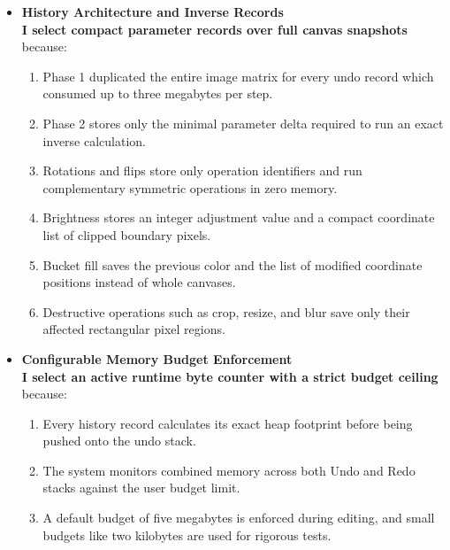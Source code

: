 \documentclass[10pt,a4paper]{article}
\begin{document}
\begin{itemize}[leftmargin=1.2em,noitemsep,topsep=2pt,parsep=1pt]
    \item \textbf{History Architecture and Inverse Records}\\[3pt]
    \textbf{I select compact parameter records over full canvas snapshots} because:
    \begin{enumerate}[label=\arabic*),leftmargin=1.5em,noitemsep,topsep=1pt,parsep=1pt]
        \item Phase 1 duplicated the entire image matrix for every undo record which consumed up to three megabytes per step.
        \item Phase 2 stores only the minimal parameter delta required to run an exact inverse calculation.
        \item Rotations and flips store only operation identifiers and run complementary symmetric operations in zero memory.
        \item Brightness stores an integer adjustment value and a compact coordinate list of clipped boundary pixels.
        \item Bucket fill saves the previous color and the list of modified coordinate positions instead of whole canvases.
        \item Destructive operations such as crop, resize, and blur save only their affected rectangular pixel regions.
    \end{enumerate}

    \item \textbf{Configurable Memory Budget Enforcement}\\[3pt]
    \textbf{I select an active runtime byte counter with a strict budget ceiling} because:
    \begin{enumerate}[label=\arabic*),leftmargin=1.5em,noitemsep,topsep=1pt,parsep=1pt]
        \item Every history record calculates its exact heap footprint before being pushed onto the undo stack.
        \item The system monitors combined memory across both Undo and Redo stacks against the user budget limit.
        \item A default budget of five megabytes is enforced during editing, and small budgets like two kilobytes are used for rigorous tests.
    \end{enumerate}


\end{itemize}
\end{document}

